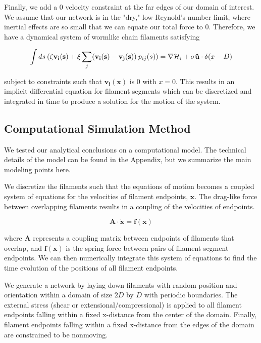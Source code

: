 \documentclass[pre,reprint]{revtex4-1}
\begin{document}
Finally, we add a 0 velocity constraint at the far edges of our domain of interest.  We assume that our network is in the "dry," low Reynold's number limit, where inertial effects are so small that we can equate our total force to 0.  Therefore, we have a dynamical system of wormlike chain filaments satisfying 

\begin{equation}
\int ds \: (\zeta\mathbf{v_i(s)} + \xi \sum _j(\mathbf{v_i(s)}-\mathbf{v_j(s)}) \: p_{ij}(s)) = \nabla {\cal H}_i + \sigma\mathbf{\hat{u}}\cdot\delta(x-D)
\end{equation}

subject to constraints such that $\mathbf{v_i(x)}$ is 0 with $x=0$.  This results in an implicit differential equation for filament segments which can be discretized and integrated in time to produce a solution for the motion of the system.


\subsection{Computational Simulation Method}

We tested our analytical conclusions on a computational model.  The technical details of the model can be found in the Appendix, but we summarize the main modeling points here.

We discretize the filaments such that the equations of motion becomes a coupled system of equations for the velocities of filament endpoints, $\mathbf{x}$.  The drag-like force between overlapping filaments results in a coupling of the velocities of endpoints.  

\begin{equation}
\mathbf{A \cdot \dot x} = \mathbf{f(x)}
\end{equation}

where $\mathbf{A }$ represents a coupling matrix between endpoints of filaments that overlap, and $\mathbf{f(x)}$ is the spring force between pairs of filament segment endpoints.  We can then numerically integrate this system of equations to find the time evolution of the positions of all filament endpoints.

We generate a network by laying down filaments with random position and orientation within a domain of size $2D$ by $D$ with periodic boundaries.  The external stress (shear or extensional/compressional) is applied to all filament endpoints falling within a fixed x-distance from the center of the domain.  Finally, filament endpoints falling within a fixed x-distance from the edges of the domain are constrained to be nonmoving.
\end{document}
